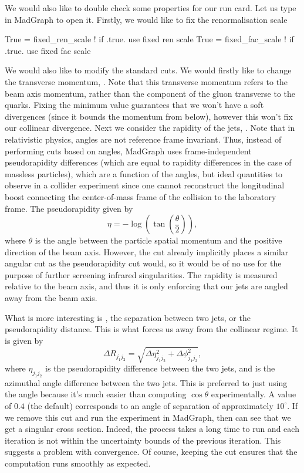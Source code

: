 We would also like to double check some properties for our run card. Let us type  in MadGraph to open it. Firstly, we would like to fix the renormalisation scale
\begin{codeenv}
 True = fixed_ren_scale  ! if .true. use fixed ren scale
     True = fixed_fac_scale  ! if .true. use fixed fac scale
\end{codeenv}
We would also like to modify the standard cuts. We would firstly like to change the transverse momentum, . Note that this transverse momentum refers to the beam axis momentum, rather than the component of the gluon transverse to the quarks. Fixing the minimum value guarantees that we won't have a soft divergences (since it bounds the momentum from below), however this won't fix our collinear divergence. Next we consider the rapidity of the jets, . Note that in relativistic physics, angles are not reference frame invariant. Thus, instead of performing cuts based on angles, MadGraph uses frame-independent pseudorapidity differences (which are equal to rapidity differences in the case of massless particles), which are a function of the angles, but ideal quantities to observe in a collider experiment since one cannot reconstruct the longitudinal boost connecting the center-of-mass frame of the collision to the laboratory frame. The pseudorapidity given by
\begin{equation}
  \eta=  -\log\left(\tan\left(\frac{\theta}{2}\right)\right),
\end{equation}
where $\theta$ is the angle between the particle spatial momentum and the positive direction of the beam axis.
However, the  cut already implicitly places a similar angular cut as the pseudorapidity cut would, so it would be of no use for the purpose of further screening infrared singularities. The rapidity is measured relative to the beam axis, and thus it is only enforcing that our jets are angled away from the beam axis.

What is more interesting is , the separation between two jets, or the pseudorapidity distance. This is what forces us away from the collinear regime. It is given by
\begin{equation}
    \Delta R_{j_1j_2}=\sqrt{\Delta\eta_{j_1j_2}^2+\Delta\phi_{j_1j_2}^2},
\end{equation}
where $\eta_{{j_1} {j_2}}$ is the pseudorapidity difference between the two jets, and 
is the azimuthal angle difference between the two jets. This is preferred to just using the angle 
because it's much easier than computing $\cos\theta$ experimentally. A value of $0.4$ (the default) corresponds to an angle of separation of approximately $10^\circ$. If we remove this cut and run the experiment in MadGraph,  then can see that we get a singular cross section. Indeed, the process takes a long time to run and each iteration is not within the uncertainty bounds of the previous iteration. This suggests a problem with convergence. Of course, keeping the cut ensures that the computation runs smoothly as expected.

